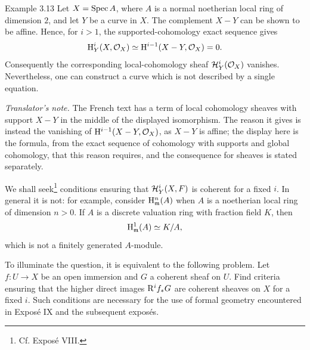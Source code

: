 \begin{sgastatement}{Example 3.13}
Let $X=\operatorname{Spec} A$, where $A$ is a normal noetherian local ring of dimension
$2$, and let $Y$ be a curve in $X$. The complement $X-Y$ can be shown to be
affine. Hence, for $i>1$, the supported-cohomology exact sequence gives
\[
  \mathrm H_Y^i(X,\mathcal O_X)
  \simeq \mathrm H^{i-1}(X-Y,\mathcal O_X)=0.
\]
Consequently the corresponding local-cohomology sheaf
$\mathcal H_Y^i(\mathcal O_X)$ vanishes. Nevertheless, one can construct a curve
which is not described by a single equation.
\end{sgastatement}

\noindent\textit{Translator's note.} The French text has a term of
local cohomology sheaves with support $X-Y$ in the middle of the displayed
isomorphism. The reason it gives is instead the vanishing of
$\mathrm H^{i-1}(X-Y,\mathcal O_X)$, as $X-Y$ is affine; the display here is the
formula, from the exact sequence of cohomology with supports and global
cohomology, that this reason requires, and the consequence for sheaves is
stated separately.

We shall seek\footnote{Cf. Expos\'e VIII.} conditions ensuring that
$\mathcal H_Y^i(X,F)$ is coherent for a fixed $i$. In general it is not: for
example, consider $\mathrm H_{\mathfrak m}^n(A)$ when $A$ is a noetherian local
ring of dimension $n>0$. If $A$ is a discrete valuation ring with fraction
field $K$, then
\[
  \mathrm H_{\mathfrak m}^1(A)\simeq K/A,
\]
which is not a finitely generated $A$-module.

To illuminate the question, it is equivalent to the following problem. Let
$f:U\to X$ be an open immersion and $G$ a coherent sheaf on $U$. Find
criteria ensuring that the higher direct images $\mathrm R^i f_*G$ are coherent
sheaves on $X$ for a fixed $i$. Such conditions are necessary for the use of
formal geometry encountered in Expos\'e IX and the subsequent expos\'es.
